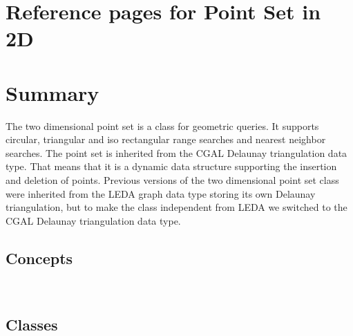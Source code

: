 

\ccParDims

\clearpage
\section{Reference pages for Point Set in 2D}

\section*{Summary}

The two dimensional point set is a class for geometric queries.
It supports circular, triangular and iso rectangular range searches and
nearest neighbor searches.
The point set is inherited from the CGAL Delaunay triangulation data type.
That means that it is a dynamic data structure supporting the insertion and
deletion of points. Previous versions of the two dimensional point set class
were inherited from the LEDA graph data type storing its own Delaunay triangulation,
but to make the class independent from LEDA we switched to the 
CGAL Delaunay triangulation data type.

\subsection*{Concepts}
\\

\subsection*{Classes}
\\


